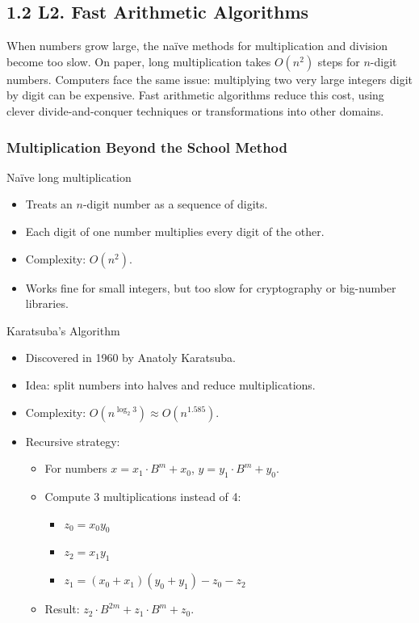 \documentclass[
  letterpaper,
  DIV=11,
  numbers=noendperiod]{scrreprt}
\providecommand{\tightlist}{%
  \setlength{\itemsep}{0pt}\setlength{\parskip}{0pt}}
\begin{document}
\subsection{1.2 L2. Fast Arithmetic
Algorithms}\label{l2.-fast-arithmetic-algorithms}

When numbers grow large, the naïve methods for multiplication and
division become too slow. On paper, long multiplication takes \(O(n^2)\)
steps for \(n\)-digit numbers. Computers face the same issue:
multiplying two very large integers digit by digit can be expensive.
Fast arithmetic algorithms reduce this cost, using clever
divide-and-conquer techniques or transformations into other domains.

\subsubsection{Multiplication Beyond the School
Method}\label{multiplication-beyond-the-school-method}

Naïve long multiplication

\begin{itemize}
\tightlist
\item
  Treats an \(n\)-digit number as a sequence of digits.
\item
  Each digit of one number multiplies every digit of the other.
\item
  Complexity: \(O(n^2)\).
\item
  Works fine for small integers, but too slow for cryptography or
  big-number libraries.
\end{itemize}

Karatsuba's Algorithm

\begin{itemize}
\item
  Discovered in 1960 by Anatoly Karatsuba.
\item
  Idea: split numbers into halves and reduce multiplications.
\item
  Complexity: \(O(n^{\log_2 3}) \approx O(n^{1.585})\).
\item
  Recursive strategy:

  \begin{itemize}
  \item
    For numbers \(x = x_1 \cdot B^m + x_0\),
    \(y = y_1 \cdot B^m + y_0\).
  \item
    Compute 3 multiplications instead of 4:

    \begin{itemize}
    \tightlist
    \item
      \(z_0 = x_0 y_0\)
    \item
      \(z_2 = x_1 y_1\)
    \item
      \(z_1 = (x_0+x_1)(y_0+y_1) - z_0 - z_2\)
    \end{itemize}
  \item
    Result: \(z_2 \cdot B^{2m} + z_1 \cdot B^m + z_0\).
  \end{itemize}
\end{itemize}
\end{document}

